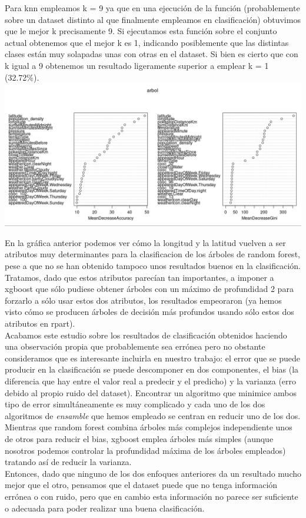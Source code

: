 Para knn empleamos k = 9 ya que en una ejecución de la función  (probablemente sobre un dataset distinto al que finalmente empleamos en clasificación) obtuvimos que le mejor k precisamente 9. Si ejecutamos esta función sobre el conjunto actual obtenemos que el mejor k es 1, indicando posiblemente que las distintas clases están muy solapadas unas con otras en el dataset. Si bien es cierto que con k igual a 9 obtenemos un resultado ligeramente superior a emplear k = 1 (32.72\%).\\

\includegraphics[width=\textwidth]{img/importancia.png}

En la gráfica anterior podemos ver cómo la longitud y la latitud vuelven a ser atributos muy determinantes para la clasificacion de los árboles de random forest, pese a que no se han obtenido tampoco unos resultados buenos en la clasificación. Tratamos, dado que estos atributos parecían tan importantes, a imponer a xgboost que sólo pudiese obtener árboles con un máximo de profundidad 2 para forzarlo a sólo usar estos dos atributos, los resultados empeoraron (ya hemos visto cómo se producen árboles de decisión más profundos usando sólo estos dos atributos en rpart).\\
 
Acabamos este estudio sobre los resultados de clasificación obtenidos haciendo una observación propia que probablemente sea errónea pero no obstante consideramos que es interesante incluirla en nuestro trabajo: el error que se puede producir en la clasificación se puede descomponer en dos componentes, el bias (la diferencia que hay entre el valor real a predecir y el predicho) y la varianza (erro debido al propio ruido del dataset). Encontrar un algoritmo que minimice ambos tipo de error simultáneamente es muy complicado y cada uno de los dos algoritmos de \textit{ensamble} que hemos empleado se centran en reducir uno de los dos. Mientras que random forest combina árboles más complejos independiente unos de otros para reducir el bias, xgboost emplea árboles más simples (aunque nosotros podemos controlar la profundidad máxima de los árboles empleados) tratando así de reducir la varianza.\\

Entonces, dado que ninguno de los dos enfoques anteriores da un resultado mucho mejor que el otro, pensamos que el dataset puede que no tenga información errónea o con ruido, pero que en cambio esta información no parece ser suficiente o adecuada para poder realizar una buena clasificación.